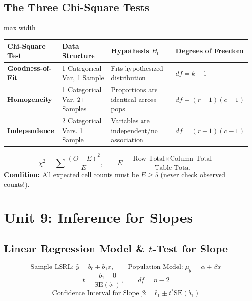 \documentclass[11pt,oneside,openany]{book}
\begin{document}
\section{The Three Chi-Square Tests}
\begin{adjustbox}{max width=\linewidth}
\begin{tabular}{llll}
\toprule
\textbf{Chi-Square Test} & \textbf{Data Structure} & \textbf{Hypothesis $H_0$} & \textbf{Degrees of Freedom} \\
\midrule
\textbf{Goodness-of-Fit} & 1 Categorical Var, 1 Sample & Fits hypothesized distribution & $df = k - 1$ \\
\textbf{Homogeneity} & 1 Categorical Var, 2+ Samples & Proportions are identical across pops & $df = (r-1)(c-1)$ \\
\textbf{Independence} & 2 Categorical Vars, 1 Sample & Variables are independent/no association & $df = (r-1)(c-1)$ \\
\bottomrule
\end{tabular}
\end{adjustbox}

\begin{equation}
  \chi^2 = \sum \frac{(O - E)^2}{E}, \qquad E = \frac{\text{Row Total} \times \text{Column Total}}{\text{Table Total}}
\end{equation}
\textbf{Condition:} All expected cell counts must be $E \ge 5$ (never check observed counts!).

\chapter{Unit 9: Inference for Slopes}

\section{Linear Regression Model \& $t$-Test for Slope}
\begin{equation}
  \text{Sample LSRL:} \; \hat{y} = b_0 + b_1 x, \qquad \text{Population Model:} \; \mu_y = \alpha + \beta x
\end{equation}
\begin{equation}
  t = \frac{b_1 - 0}{\text{SE}(b_1)}, \qquad df = n - 2
\end{equation}
\begin{equation}
  \text{Confidence Interval for Slope } \beta: \quad b_1 \pm t^* \text{SE}(b_1)
\end{equation}
\end{document}
